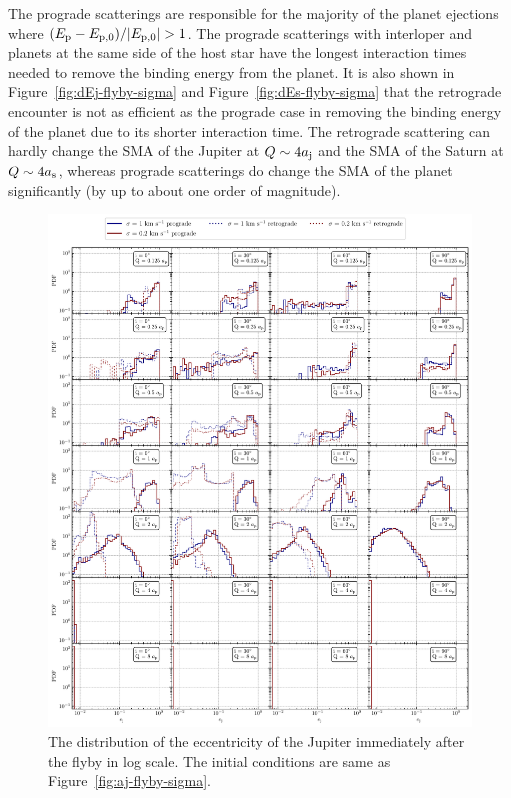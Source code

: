 \documentclass[twocolumn]{aastex63}
\newcommand*\fgr[1]{Figure~\ref{#1}}
\begin{document}
The prograde scatterings are responsible for the majority of the planet ejections where $(E_{\rm p} - E_{\rm p,0})/|E_{\rm p,0}| > 1$. The prograde scatterings with interloper and planets at the same side of the host star have the longest interaction times needed to remove the binding energy from the planet. It is also shown in  \fgr{fig:dEj-flyby-sigma} and \fgr{fig:dEs-flyby-sigma} that the retrograde encounter is not as efficient as the prograde case in removing the binding energy of the planet due to its shorter interaction time. The retrograde scattering can hardly change the SMA of the Jupiter at $Q\sim 4a_{\rm j}$ and the SMA of the Saturn at $Q\sim 4a_{\rm s}$, whereas prograde scatterings do change the SMA of the planet significantly (by up to about one order of magnitude).

\begin{figure}
    \includegraphics[width=\textwidth]{figs/ej-flyby-sigma.pdf}
    \caption{The distribution of the eccentricity of the Jupiter immediately after the flyby in log scale.  The initial conditions are same as \fgr{fig:aj-flyby-sigma}.} 
    \label{fig:ej-flyby-sigma}
\end{figure}
\end{document}
